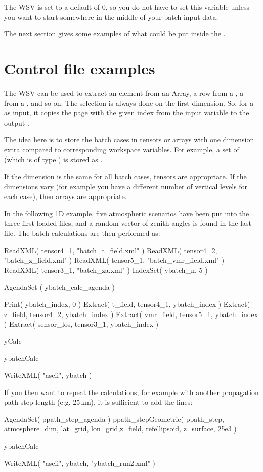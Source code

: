 The WSV  is set to a default of 0,
so you do not have to set this variable
unless you want to start somewhere in the middle of your batch input
data. 

The next section gives some examples of what could be put inside
the .

\section{Control file examples}
%
The WSV  can be used to extract an element from an
Array, a row from a , a
 from a , and so on. The
selection is always done on the first dimension. So, for a
 as input, it copies the page with the given index
from the input  variable to the output
.

The idea here is to store the batch cases in tensors or arrays with
one dimension extra compared to corresponding workspace variables. For
example, a set of  (which is of type
) is stored as .

If the dimension is the same for all batch cases, tensors are
appropriate. If the dimensions vary (for example you have a different
number of vertical levels for each case), then arrays are appropriate.

In the following 1D example, five atmospheric scenarios
have been put into the three first loaded files, and a random vector
of zenith angles is found in the last file. The batch calculations
are then performed as:

\begin{code}
ReadXML( tensor4_1, "batch_t_field.xml" )
ReadXML( tensor4_2, "batch_z_field.xml" )
ReadXML( tensor5_1, "batch_vmr_field.xml" )
ReadXML( tensor3_1, "batch_za.xml" )
IndexSet( ybatch_n, 5 )

AgendaSet ( ybatch_calc_agenda ){
  Print( ybatch_index, 0 )
  Extract( t_field,    tensor4_1, ybatch_index )
  Extract( z_field,    tensor4_2, ybatch_index )
  Extract( vmr_field,  tensor5_1, ybatch_index )
  Extract( sensor_los, tensor3_1, ybatch_index )

  yCalc
}

ybatchCalc

WriteXML( "ascii", ybatch )
\end{code}

If you then want to repeat the calculations, for example with another
propagation path step length (e.g. 25\,km), it is sufficient to add
the lines:

\begin{code}
AgendaSet( ppath_step_agenda ){
   ppath_stepGeometric( ppath_step, atmosphere_dim, lat_grid,
                        lon_grid,z_field, refellipsoid, z_surface,
                        25e3 )
}

ybatchCalc

WriteXML( "ascii", ybatch, "ybatch_run2.xml" )
\end{code}


